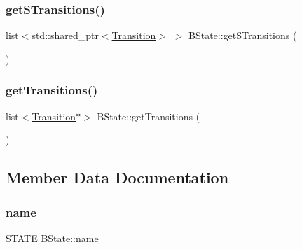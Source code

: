 \mbox{\label{classBState_a3314d0c5e4a877f3b14c153e285611d9}} 
\subsubsection{\texorpdfstring{get\+S\+Transitions()}{getSTransitions()}}
{\footnotesize\ttfamily list$<$std\+::shared\+\_\+ptr$<$\hyperlink{classTransition}{Transition}$>$ $>$ B\+State\+::get\+S\+Transitions (\begin{DoxyParamCaption}{ }\end{DoxyParamCaption})\hspace{0.3cm}{\ttfamily [inline]}}

\mbox{\label{classBState_a12a62f55d5136baa914a5a9296fc1a94}} 
\subsubsection{\texorpdfstring{get\+Transitions()}{getTransitions()}}
{\footnotesize\ttfamily list$<$\hyperlink{classTransition}{Transition}$\ast$$>$ B\+State\+::get\+Transitions (\begin{DoxyParamCaption}{ }\end{DoxyParamCaption})\hspace{0.3cm}{\ttfamily [inline]}}



\subsection{Member Data Documentation}
\mbox{\label{classBState_ac4a447d0ad6729605fd5b0d74f5273bb}} 
\subsubsection{\texorpdfstring{name}{name}}
{\footnotesize\ttfamily \hyperlink{BState_8h_a275a67132f10277ada3a0ee3d616b647}{S\+T\+A\+TE} B\+State\+::name\hspace{0.3cm}{\ttfamily [private]}}

\mbox{\label{classBState_a5435ea55aa101d3b45474c81e53d1d42}} 
